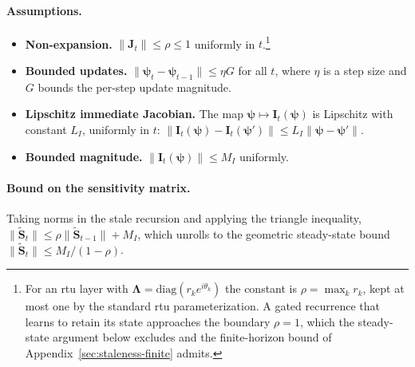 \documentclass{article}
\begin{document}
\paragraph{Assumptions.}
\begin{itemize}
    \item[(A1)] \textbf{Non-expansion.} $\|\boldsymbol{J}_t\| \le \rho \le 1$ uniformly in
    $t$.\footnote{For an \gls{rtu} layer with
    $\boldsymbol{\Lambda} = \mathrm{diag}(r_k e^{i\theta_k})$ the constant is
    $\rho = \max_k r_k$, kept at most one by the standard \gls{rtu}
    parameterization. A gated recurrence that learns to retain its state
    approaches the boundary $\rho = 1$, which the steady-state argument below
    excludes and the finite-horizon bound of
    Appendix~\ref{sec:staleness-finite} admits.}
    \item[(A2)] \textbf{Bounded updates.}
    $\|\boldsymbol{\psi}_t - \boldsymbol{\psi}_{t-1}\| \le \eta G$ for all $t$, where $\eta$ is a
    step size and $G$ bounds the per-step update magnitude.
    \item[(A3)] \textbf{Lipschitz immediate Jacobian.} The map
    $\boldsymbol{\psi} \mapsto \boldsymbol{I}_t(\boldsymbol{\psi})$ is Lipschitz with constant $L_I$,
    uniformly in $t$:
    $\|\boldsymbol{I}_t(\boldsymbol{\psi}) - \boldsymbol{I}_t(\boldsymbol{\psi'})\| \le L_I \|\boldsymbol{\psi} - \boldsymbol{\psi'}\|$.
    \item[(A4)] \textbf{Bounded magnitude.}
    $\|\boldsymbol{I}_t(\boldsymbol{\psi})\| \le M_I$ uniformly.
\end{itemize}

\paragraph{Bound on the sensitivity matrix.}
Taking norms in the stale recursion and applying the triangle inequality,
$\|\tilde{\boldsymbol{S}}_t\| \le \rho \|\tilde{\boldsymbol{S}}_{t-1}\| + M_I$,
which unrolls to the geometric steady-state bound
$\|\tilde{\boldsymbol{S}}_t\| \le M_I / (1 - \rho)$.
\end{document}
